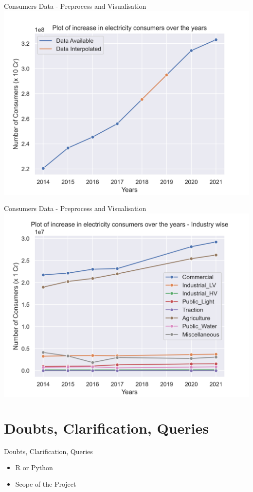 \documentclass{beamer}
\begin{document}
\begin{frame}{Consumers Data - Preprocess and Visualisation}
    \includegraphics[scale=.6]{images/Cons.png}
\end{frame}

\begin{frame}{Consumers Data - Preprocess and Visualisation}
    \includegraphics[scale=.6]{images/Cons_Ind.png}
\end{frame}

\section{Doubts, Clarification, Queries}
\begin{frame}{Doubts, Clarification, Queries}
    \begin{itemize}
        \item R or Python
        \item Scope of the Project
        
    \end{itemize}
    
\end{frame}
\end{document}
